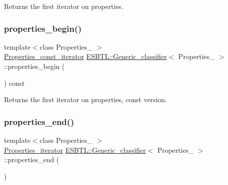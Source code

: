 Returns the first iterator on properties. \mbox{\label{structESBTL_1_1Generic__classifier_a2a81b08a15d82ae5b4cd572e51d6ef64}} 
\subsubsection{\texorpdfstring{properties\+\_\+begin()}{properties\_begin()}\hspace{0.1cm}{\footnotesize\ttfamily [2/2]}}
{\footnotesize\ttfamily template$<$class Properties\+\_\+ $>$ \\
\hyperlink{structESBTL_1_1Generic__classifier_aa2bfed4b529df9cbc252bacf20a15174}{Properties\+\_\+const\+\_\+iterator} \hyperlink{structESBTL_1_1Generic__classifier}{E\+S\+B\+T\+L\+::\+Generic\+\_\+classifier}$<$ Properties\+\_\+ $>$\+::properties\+\_\+begin (\begin{DoxyParamCaption}{ }\end{DoxyParamCaption}) const\hspace{0.3cm}{\ttfamily [inline]}}

Returns the first iterator on properties, const version. \mbox{\label{structESBTL_1_1Generic__classifier_aa0a9cd5820b85da21d898b6bd2bdb2ae}} 
\subsubsection{\texorpdfstring{properties\+\_\+end()}{properties\_end()}\hspace{0.1cm}{\footnotesize\ttfamily [1/2]}}
{\footnotesize\ttfamily template$<$class Properties\+\_\+ $>$ \\
\hyperlink{structESBTL_1_1Generic__classifier_a5f82ff1a1ee75714d393ded0c3824fe6}{Properties\+\_\+iterator} \hyperlink{structESBTL_1_1Generic__classifier}{E\+S\+B\+T\+L\+::\+Generic\+\_\+classifier}$<$ Properties\+\_\+ $>$\+::properties\+\_\+end (\begin{DoxyParamCaption}{ }\end{DoxyParamCaption})\hspace{0.3cm}{\ttfamily [inline]}}

